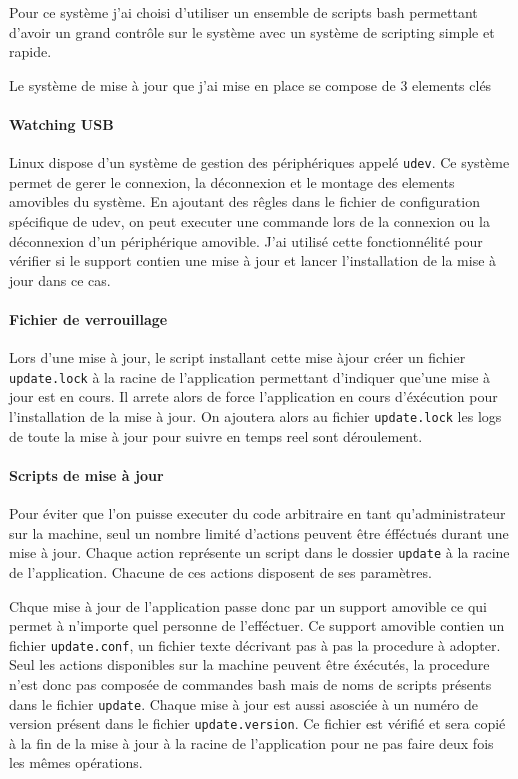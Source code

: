 Pour ce système j'ai choisi d'utiliser un ensemble de scripts bash permettant d'avoir un grand contrôle sur le système avec un système de scripting simple et rapide.

Le système de mise à jour que j'ai mise en place se compose de 3 elements clés

\paragraph{Watching USB} Linux dispose d'un système de gestion des périphériques appelé \texttt{udev}.
Ce système permet de gerer le connexion, la déconnexion et le montage des elements amovibles du système.
En ajoutant des rêgles dans le fichier de configuration spécifique de udev, on peut executer une commande lors de la connexion ou la déconnexion d'un périphérique amovible.
J'ai utilisé cette fonctionnélité pour vérifier si le support contien une mise à jour et lancer l'installation de la mise à jour dans ce cas.

\paragraph{Fichier de verrouillage} Lors d'une mise à jour, le script installant cette mise àjour créer un fichier \texttt{update.lock} à la racine de l'application permettant d'indiquer que'une mise à jour est en cours.
Il arrete alors de force l'application en cours d'éxécution pour l'installation de la mise à jour.
On ajoutera alors au fichier \texttt{update.lock} les logs de toute la mise à jour pour suivre en temps reel sont déroulement.

\paragraph{Scripts de mise à jour} Pour éviter que l'on puisse executer du code arbitraire en tant qu'administrateur sur la machine, seul un nombre limité d'actions peuvent être éfféctués durant une mise à jour.
Chaque action représente un script dans le dossier \texttt{update} à la racine de l'application.
Chacune de ces actions disposent de ses paramètres.

\medskip

Chque mise à jour de l'application passe donc par un support amovible ce qui permet à n'importe quel personne de l'efféctuer.
Ce support amovible contien un fichier \texttt{update.conf}, un fichier texte décrivant pas à pas la procedure à adopter.
Seul les actions disponibles sur la machine peuvent être éxécutés, la procedure n'est donc pas composée de commandes bash mais de noms de scripts présents dans le fichier \texttt{update}.
Chaque mise à jour est aussi asosciée à un numéro de version présent dans le fichier \texttt{update.version}.
Ce fichier est vérifié et sera copié à la fin de la mise à jour à la racine de l'application pour ne pas faire deux fois les mêmes opérations.

